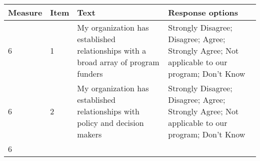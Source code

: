 \documentclass[]{article}
\begin{document}
\begin{longtable}[]{@{}llll@{}}
\toprule
\begin{minipage}[b]{0.05\columnwidth}\raggedright\strut
Measure\strut
\end{minipage} & \begin{minipage}[b]{0.04\columnwidth}\raggedright\strut
Item\strut
\end{minipage} & \begin{minipage}[b]{0.41\columnwidth}\raggedright\strut
Text\strut
\end{minipage} & \begin{minipage}[b]{0.39\columnwidth}\raggedright\strut
Response options\strut
\end{minipage}\tabularnewline
\midrule
\endhead
\begin{minipage}[t]{0.05\columnwidth}\raggedright\strut
6\strut
\end{minipage} & \begin{minipage}[t]{0.04\columnwidth}\raggedright\strut
1\strut
\end{minipage} & \begin{minipage}[t]{0.41\columnwidth}\raggedright\strut
My organization has established relationships with a broad array of
program funders\strut
\end{minipage} & \begin{minipage}[t]{0.39\columnwidth}\raggedright\strut
Strongly Disagree; Disagree; Agree; Strongly Agree; Not applicable to
our program; Don't Know\strut
\end{minipage}\tabularnewline
\begin{minipage}[t]{0.05\columnwidth}\raggedright\strut
6\strut
\end{minipage} & \begin{minipage}[t]{0.04\columnwidth}\raggedright\strut
2\strut
\end{minipage} & \begin{minipage}[t]{0.41\columnwidth}\raggedright\strut
My organization has established relationships with policy and decision
makers\strut
\end{minipage} & \begin{minipage}[t]{0.39\columnwidth}\raggedright\strut
Strongly Disagree; Disagree; Agree; Strongly Agree; Not applicable to
our program; Don't Know\strut
\end{minipage}\tabularnewline
\begin{minipage}[t]{0.05\columnwidth}\raggedright\strut
6\strut
\end{minipage} & \begin{minipage}[t]{0.04\columnwidth}\raggedright\strut

\end{minipage}
\end{longtable}
\end{document}
